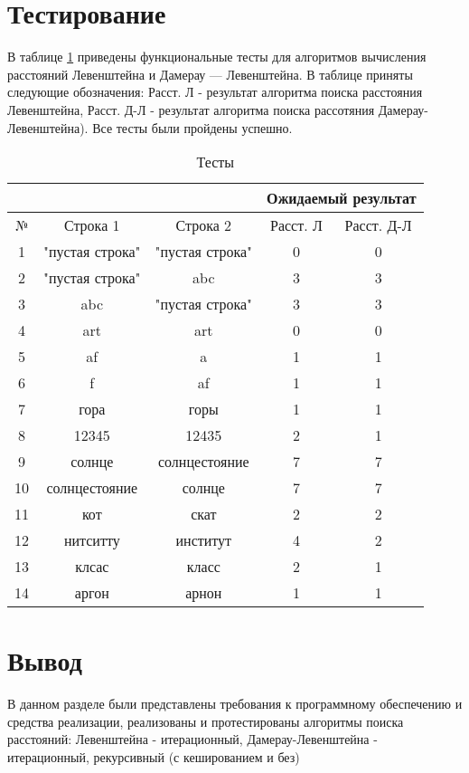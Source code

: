 \section{Тестирование}

В таблице \ref{test} приведены функциональные тесты для алгоритмов вычисления расстояний Левенштейна и Дамерау — Левенштейна. В таблице приняты следующие обозначения: Расст. Л - результат алгоритма поиска расстояния Левенштейна, Расст. Д-Л - результат алгоритма поиска рассотяния Дамерау-Левенштейна). Все тесты были пройдены успешно.

\begin{table}[h]
	\begin{center}
		\caption{\label{test} Тесты}
		\begin{tabular}{|c|c|c|c|c|}
			\hline
			& & & \multicolumn{2}{c|}{\bfseries Ожидаемый результат}    \\ \cline{3-4}\hline
			№ & Строка 1& Строка 2 & Расст. Л & Расст. Д-Л \\ [0.5ex] 
			\hline
			1 & "пустая строка" & "пустая строка" & 0 & 0\\
			\hline
			2 & "пустая строка" & abc & 3 & 3\\
			\hline
			3 & abc & "пустая строка" & 3 & 3\\
			\hline
			4 & art & art & 0 & 0\\
			\hline
			5 & af & a & 1 & 1\\
			\hline
			6 & f & af & 1 & 1\\
			\hline
			7 & гора & горы & 1 & 1\\
			\hline
			8 & 12345 & 12435 & 2 & 1\\
			\hline
			9 & солнце & солнцестояние & 7 & 7\\
			\hline
			10 & солнцестояние & солнце & 7 & 7\\
			\hline
			11 & кот & скат & 2 & 2\\
			\hline
			12 & нитситту & институт & 4 & 2\\
			\hline
			13 & клсас & класс & 2 & 1\\
			\hline
			14 & аргон & арнон & 1 & 1\\
			\hline
		\end{tabular}
	\end{center}
\end{table}

\section*{Вывод}

В данном разделе были представлены требования к программному обеспечению и средства реализации, реализованы и протестированы алгоритмы поиска расстояний: Левенштейна - итерационный, Дамерау-Левенштейна - итерационный, рекурсивный (с кешированием и без)

